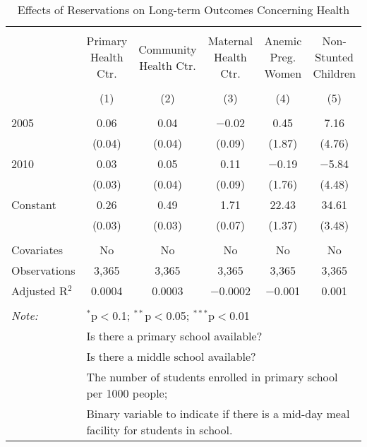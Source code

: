 
\begin{table}[!htbp] \centering 
  \caption{Effects of Reservations on Long-term Outcomes Concerning Health} 
  \label{raj_shrug_health_05_10} 
\scriptsize 
\begin{tabular}{@{\extracolsep{5pt}}lccccc} 
\\[-1.8ex]\hline 
\hline \\[-1.8ex] 
 & Primary Health Ctr. & Community Health Ctr. & Maternal Health Ctr. & Anemic Preg. Women & Non-Stunted Children \\ 
\\[-1.8ex] & (1) & (2) & (3) & (4) & (5)\\ 
\hline \\[-1.8ex] 
 2005 & 0.06 & 0.04 & $-$0.02 & 0.45 & 7.16 \\ 
  & (0.04) & (0.04) & (0.09) & (1.87) & (4.76) \\ 
  2010 & 0.03 & 0.05 & 0.11 & $-$0.19 & $-$5.84 \\ 
  & (0.03) & (0.04) & (0.09) & (1.76) & (4.48) \\ 
  Constant & 0.26 & 0.49 & 1.71 & 22.43 & 34.61 \\ 
  & (0.03) & (0.03) & (0.07) & (1.37) & (3.48) \\ 
 \hline \\[-1.8ex] 
Covariates & No & No & No & No & No \\ 
Observations & 3,365 & 3,365 & 3,365 & 3,365 & 3,365 \\ 
Adjusted R$^{2}$ & 0.0004 & 0.0003 & $-$0.0002 & $-$0.001 & 0.001 \\ 
\hline 
\hline \\[-1.8ex] 
\textit{Note:}  & \multicolumn{5}{l}{$^{*}$p$<$0.1; $^{**}$p$<$0.05; $^{***}$p$<$0.01} \\ 
 & \multicolumn{5}{l}{Is there a primary school available?} \\ 
 & \multicolumn{5}{l}{Is there a middle school available?} \\ 
 & \multicolumn{5}{l}{The number of students enrolled in primary school per 1000 people;} \\ 
 & \multicolumn{5}{l}{Binary variable to indicate if there is a mid-day meal facility for students in school.} \\ 
\end{tabular} 
\end{table} 
